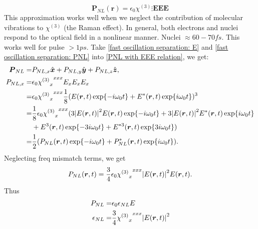 \documentclass[12pt]{extarticle}
\numberwithin{equation}{section}
\numberwithin{figure}{section}
\numberwithin{table}{section}
\newcommand{\<}{\langle}
\renewcommand{\>}{\rangle}
\theoremstyle{definition}
\begin{document}
\begin{itemize}
\begin{equation}
                    \boldsymbol{P}_{NL}(\boldsymbol{r}) = \epsilon_0 \chi^{(3)} \vdots \boldsymbol{EEE}
                \end{equation}
                This approximation works well when we neglect the contribution of molecular vibrations to $\chi^{(3)}$ (the Raman effect). In general, both electrons and nuclei respond to the optical field in a nonlinear manner. Nuclei $\approx 60-70fs$. This works well for pulse $>1ps$. Take \autoref{fast oscillation separation: E} and \autoref{fast oscillation separation: PNL} into \autoref{PNL with EEE relation}, we get:
                \begin{equation}
                \begin{split}
                    \boldsymbol{P}_{NL}=& P_{NL,x}\hat{\boldsymbol{x}}+P_{NL,y}\hat{\boldsymbol{y}}+P_{NL,z}\hat{\boldsymbol{z}},\\
                    P_{NL,x}=&\epsilon_0 {{\chi^{(3)}}_x}^{xxx} E_x E_x E_x\\
                    =&\epsilon_0 {{\chi^{(3)}}_x}^{xxx} \frac{1}{8}(E(\boldsymbol{r},t)\exp{-i\omega_0 t}+E^{*}(\boldsymbol{r},t)\exp{i\omega_0 t})^3\\
                    =&\frac{1}{8} \epsilon_0 {{\chi^{(3)}}_x}^{xxx}(3\abs{E(\boldsymbol{r},t)}^2 E(\boldsymbol{r},t)\exp{-i\omega_0 t}+3\abs{E(\boldsymbol{r},t)}^2 E^{*}(\boldsymbol{r},t)\exp{i\omega_0 t}\\
                    &+E^3(\boldsymbol{r},t)\exp{-3i\omega_0 t}+E^{*3}(\boldsymbol{r},t)\exp{3i\omega_0 t})\\
                    =&\frac{1}{2}(P_{NL}(\boldsymbol{r},t)\exp{-i\omega_0 t}+P_{NL}^{*}(\boldsymbol{r},t)\exp{i\omega_0 t}).
                \end{split}
                \end{equation}
                Neglecting freq mismatch terms, we get
                \begin{equation}
                    P_{NL}(\boldsymbol{r},t) = \frac{3}{4}\epsilon_0{{\chi^{(3)}}_x}^{xxx}\abs{E(\boldsymbol{r},t)}^2E(\boldsymbol{r},t).
                \end{equation}
                Thus
                \begin{subequations}
                \begin{align}
                    P_{NL}=&\epsilon_0\epsilon_{NL}E\\
                    \epsilon_{NL}=&\frac{3}{4}{{\chi^{(3)}}_x}^{xxx}\abs{E(\boldsymbol{r},t)}^2\label{Nonlinear epsilon relation with chi3 and E}

\end{align}
\end{subequations}
\end{itemize}
\end{document}
